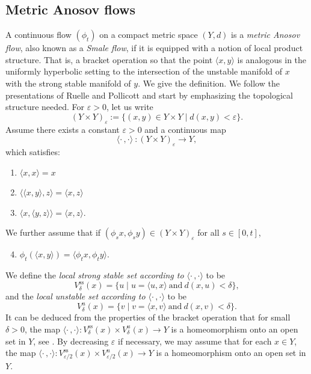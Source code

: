 \documentclass[11pt]{article}
\let\epsilon\varepsilon
\let\sep\mid
\newcommand{\lrangle}{\langle\cdot\,,\cdot\rangle}
\newenvironment{enumeratea}
{\bgroup\def\theenumi{\alph{enumi}}\begin{enumerate}}
{\end{enumerate}\egroup}
\newcommand{\sts}{\mathrm{ss}}
\theoremstyle{definition}
\numberwithin{equation}{section}
\begin{document}
\subsection{Metric Anosov flows}\label{sec:smale}
A continuous flow $(\phi_t)$ on a compact metric space $(Y, d)$ is a \emph{metric Anosov flow}, also known as a \emph{Smale flow}, if it is equipped with a notion of local product structure. That is, a bracket operation so that the point $\langle x,y\rangle $ is analogous in the uniformly hyperbolic setting to the intersection of the unstable manifold of $x$ with the strong stable manifold of $y$. We give the definition. We follow the presentations of Ruelle and Pollicott and start by emphasizing the topological structure needed. For $\epsilon>0$, let us write
\[ (Y \times Y)_\epsilon := \{(x,y) \in Y \times Y \sep d(x,y) < \epsilon\}. \]
Assume there exists a constant $\epsilon>0$ and a continuous map
\[ \lrangle ~: (Y \times Y)_\epsilon \to Y, \]
which satisfies:
\begin{enumeratea}
\item\label{enum:a} $\langle x,x\rangle =x$
\item\label{enum:b} $\langle \langle x,y\rangle,z\rangle =\langle x, z\rangle $
\item\label{enum:c} $\langle x, \langle y,z\rangle \rangle =\langle x, z\rangle $.
\end{enumeratea}
\noindent
We further assume that if $(\phi_sx,\phi_sy) \in (Y\times Y)_\epsilon$ for all $s\in[0,t]$,
\begin{enumeratea}\setcounter{enumi}{3}
\item\label{enum:d}$\phi_t(\langle x,y \rangle)= \langle \phi_tx, \phi_ty \rangle$.
\end{enumeratea}
\noindent
We define the \emph{local strong stable set according to $\lrangle $} to be
\[ V^{\sts}_\delta (x) = \{ u \sep u = \langle u,x\rangle \mathrm{ ~and~ } d(x, u)< \delta \}, \]
and the \emph{local unstable set according to $\lrangle $} to be
\[ V^{u}_\delta (x) = \{ v \sep v = \langle x,v\rangle \mathrm{ ~and~ } d(x, v)< \delta \}. \]
It can be deduced from the properties of the bracket operation that for small $\delta>0$, the map $\lrangle : V^{\sts}_{\delta} (x) \times V^{u}_{\delta} (x) \to Y$ is a homeomorphism onto an open set in $Y$, see \cite[\S7.1]{Ruelle}.
By decreasing $\epsilon$ if necessary, we may assume that for each $x \in Y$, the map $\lrangle : V^{\sts}_{\epsilon/2} (x) \times V^{u}_{\epsilon/2} (x) \to Y$ is a homeomorphism onto an open set in $Y$.
\end{document}
